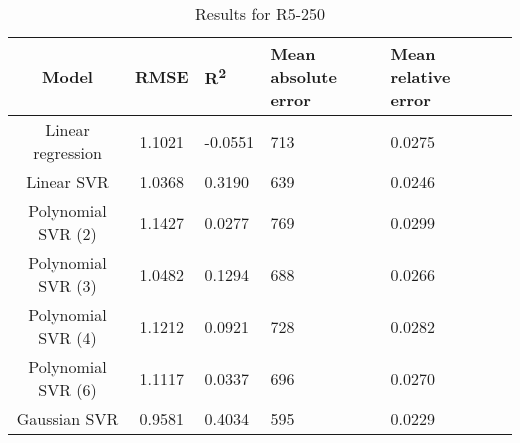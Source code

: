 \begin{table}[H]
\centering
\begin{adjustbox}{center}
\begin{tabular}{c | c M{1.2cm} M{2.5cm} M{2.5cm} M{1.8cm}}
Model & RMSE & R\textsuperscript{2} & Mean absolute error & Mean relative error \tabularnewline
\hline
Linear regression & 1.1021 & -0.0551 &    713 & 0.0275 \\
Linear SVR & 1.0368 & 0.3190 &    639 & 0.0246 \\
Polynomial SVR (2) & 1.1427 & 0.0277 &    769 & 0.0299 \\
Polynomial SVR (3) & 1.0482 & 0.1294 &    688 & 0.0266 \\
Polynomial SVR (4) & 1.1212 & 0.0921 &    728 & 0.0282 \\
Polynomial SVR (6) & 1.1117 & 0.0337 &    696 & 0.0270 \\
Gaussian SVR & 0.9581 & 0.4034 &    595 & 0.0229 \\
\end{tabular}
\end{adjustbox}
\\
\caption{Results for R5-250}
\label{tab:coreonly_linear_R5_250}
\end{table}
